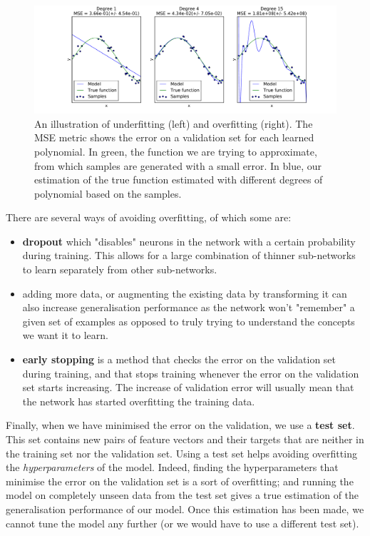 \begin{figure}
	\centering
	\includegraphics[width=0.8\linewidth]{fig/overfitting.pdf}
	\caption{An illustration of underfitting (left) and overfitting (right).
	The MSE metric shows the error on a validation set for each learned
	polynomial. In green, the function we are trying to approximate, from
	which samples are generated with a small error. In blue, our estimation of
	the true function estimated with different degrees of polynomial
	based on the samples.}
	\label{fig:overfitting}
\end{figure}

There are several ways of avoiding overfitting, of which some are:
\begin{itemize}
	\item \textbf{dropout} \cite{dropout} which "disables" neurons in the 
		network with a certain probability during training. This allows
		for a large combination of thinner sub-networks to learn
		separately from other sub-networks.
	\item adding more data, or augmenting the existing data by transforming
		it can also increase generalisation performance as the network
		won't "remember" a given set of examples as opposed to truly
		trying to understand the concepts we want it to learn.
	\item \textbf{early stopping} is a method that checks the error
		on the validation set during training, and that stops training
		whenever the error on the validation set starts increasing.
		The increase of validation error will usually mean that the
		network has started overfitting the training data.
\end{itemize}

Finally, when we have minimised the error on the validation, we use 
a \textbf{test set}. This set contains new pairs of feature vectors and their
targets that are neither in the training set nor the validation set. Using
a test set helps avoiding overfitting the \textit{hyperparameters} of the model.
Indeed, finding the hyperparameters that minimise the error on the validation
set is a sort of overfitting; and running the model on completely unseen
data from the test set gives a true estimation of the generalisation performance
of our model. Once this estimation has been made, we cannot tune the model
any further (or we would have to use a different test set).

